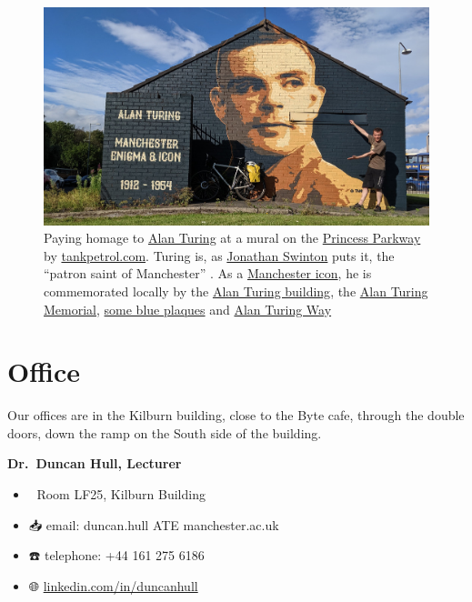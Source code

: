 \documentclass[
  12pt,
]{book}
\providecommand{\tightlist}{%
  \setlength{\itemsep}{0pt}\setlength{\parskip}{0pt}}
\begin{document}
\begin{figure}

{\centering \includegraphics[width=1\linewidth]{images/turingicon} 

}

\caption{Paying homage to \href{https://en.wikipedia.org/wiki/Alan_Turing}{Alan Turing} at a mural on the \href{https://en.wikipedia.org/wiki/A5103_road}{Princess Parkway} by \href{http://tankpetrol.com/}{tankpetrol.com}. Turing is, as \href{https://www.manturing.net/jonathan}{Jonathan Swinton} puts it, the ``patron saint of Manchester'' \citep{manturing}. As a \href{https://en.wikipedia.org/wiki/Symbols_of_Manchester}{Manchester icon}, he is commemorated locally by the \href{https://en.wikipedia.org/wiki/Alan_Turing_Building}{Alan Turing building}, the \href{https://en.wikipedia.org/wiki/Alan_Turing_Memorial}{Alan Turing Memorial}, \href{https://duncan.hull.name/2021/07/07/turings-house/}{some blue plaques} and \href{https://www.google.com/maps/place/Alan+Turing+Way,+Manchester/}{Alan Turing Way} \citep{turingway}}\label{fig:unnamed-chunk-9}
\end{figure}

\hypertarget{office}{%
\section{Office}\label{office}}

Our offices are in the Kilburn building, close to the Byte cafe, through the double doors, down the ramp on the South side of the building.

\textbf{Dr.~Duncan Hull, Lecturer} 👨‍💻

\begin{itemize}
\tightlist
\item
  🏢 Room LF25, Kilburn Building
\item
  📥 email: duncan.hull ATE manchester.ac.uk
\item
  ☎️ telephone: +44 161 275 6186
\item
  🌐 \href{https://uk.linkedin.com/in/duncanhull}{linkedin.com/in/duncanhull}
\end{itemize}
\end{document}
